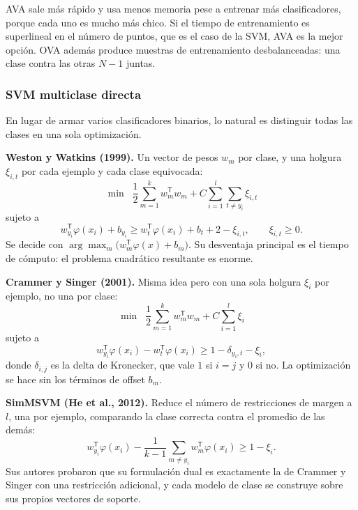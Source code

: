 \documentclass[11pt,letterpaper]{article}
\begin{document}
AVA sale más rápido y usa menos memoria pese a entrenar más
clasificadores, porque cada uno es mucho más chico. Si el tiempo de
entrenamiento es superlineal en el número de puntos, que es el caso de
la SVM, AVA es la mejor opción. OVA además produce muestras de
entrenamiento desbalanceadas: una clase contra las otras $N-1$ juntas.

\subsubsection*{SVM multiclase directa}

En lugar de armar varios clasificadores binarios, lo natural es
distinguir todas las clases en una sola optimización.

\textbf{Weston y Watkins (1999).} Un vector de pesos $w_m$ por clase, y
una holgura $\xi_{i,t}$ por cada ejemplo y cada clase equivocada:
\[
    \min \;\; \frac{1}{2}\sum_{m=1}^{k} w_m^{\mathsf{T}} w_m
    + C \sum_{i=1}^{l} \sum_{t \neq y_i} \xi_{i,t}
\]
sujeto a
\[
    w_{y_i}^{\mathsf{T}} \varphi(x_i) + b_{y_i} \geq
    w_{t}^{\mathsf{T}} \varphi(x_i) + b_{t} + 2 - \xi_{i,t} ,
    \qquad \xi_{i,t} \geq 0 .
\]
Se decide con $\arg\max_m \big(w_m^{\mathsf{T}}\varphi(x) + b_m\big)$.
Su desventaja principal es el tiempo de cómputo: el problema
cuadrático resultante es enorme.

\textbf{Crammer y Singer (2001).} Misma idea pero con una sola holgura
$\xi_i$ por ejemplo, no una por clase:
\[
    \min \;\; \frac{1}{2}\sum_{m=1}^{k} w_m^{\mathsf{T}} w_m
    + C \sum_{i=1}^{l} \xi_i
\]
sujeto a
\[
    w_{y_i}^{\mathsf{T}} \varphi(x_i)
    - w_{t}^{\mathsf{T}} \varphi(x_i)
    \geq 1 - \delta_{y_i, t} - \xi_i ,
\]
donde $\delta_{i,j}$ es la delta de Kronecker, que vale $1$ si $i = j$
y $0$ si no. La optimización se hace sin los términos de offset $b_m$.

\textbf{SimMSVM (He et al., 2012).} Reduce el número de restricciones
de margen a $l$, una por ejemplo, comparando la clase correcta contra
el promedio de las demás:
\[
    w_{y_i}^{\mathsf{T}} \varphi(x_i)
    - \frac{1}{k-1} \sum_{m \neq y_i}
      w_m^{\mathsf{T}} \varphi(x_i) \geq 1 - \xi_i .
\]
Sus autores probaron que su formulación dual es exactamente la de
Crammer y Singer con una restricción adicional, y cada modelo de clase
se construye sobre sus propios vectores de soporte.

\newpage

\end{document}
